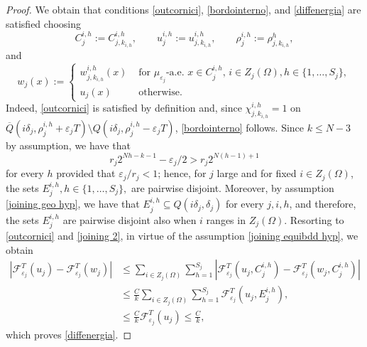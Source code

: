 \documentclass{article}
\theoremstyle{plain}
\theoremstyle{definition}
\newcommand{\ej}{\varepsilon_j}
\newcommand{\rj}{r_j}
\newcommand{\dej}{\delta_j}
\newcommand{\F}{\mathcal{F}}
\newcommand{\Q}
{\overline{Q}}
\numberwithin{equation}{section}
\begin{document}
\begin{proof}
We obtain that conditions \eqref{outcornici}, \eqref{bordointerno}, and \eqref{diffenergia} are satisfied choosing
\begin{equation*}
    C^{i,h}_j:=C^{i,h}_{j,k_{i,h}}, \qquad u_j^{i,h}:=u_{j,k_{i,h}}^{i,h}, \qquad \rho^{i,h}_j:=\rho^{h}_{j, k_{i,h}},
\end{equation*}
     and
     \begin{equation*}
         w_j(x):= \begin{cases}
             w^{i,h}_{j, k_{i,h}}(x) &  \text{ for } \mu_{\ej}\text{-a.e. } x\in C^{i,h}_{j},\,  i\in Z_j(\Omega), h\in\{1,\dots,S_j\}, \\
             u_j(x) & \text{ otherwise}.
         \end{cases}
     \end{equation*}
     Indeed, \eqref{outcornici} is satisfied by definition and, since $\chi_{j, k_{i,h}}^{i,h}=1$ on $\Q(i\dej,\rho^{i,h}_{j}+\ej T)\setminus Q(i\dej,\rho^{i,h}_{j}-\ej T)$, \eqref{bordointerno} follows. Since $k\leq N-3$ by assumption, we have that
     \begin{equation*}
         \rj2^{Nh-k-1}-\ej/2>\rj 2^{N(h-1)+1}
     \end{equation*}
     for every $h$ provided that $\ej/\rj<1$; hence, for $j$ large and for fixed $i\in Z_j(\Omega)$, the sets $E_j^{i,h}, h\in\{1,\dots,S_j\},$ are pairwise disjoint. Moreover, by assumption \eqref{joining geo hyp}, we have that $E^{i,h}_j\subseteq Q(i\dej,\dej)$ for every $j,i,h$, and therefore,
     the sets $E_j^{i,h}$ are pairwise disjoint also when $i$ ranges in $Z_j(\Omega)$. Resorting to \eqref{outcornici} and \eqref{joining 2}, in virtue of the assumption \eqref{joining equibdd hyp}, we obtain
     \begin{align*}
          |\F^T_{\ej}(u_j)-\F^T_{\ej}(w_j)|& \leq \sum_{i\in Z_j(\Omega)}\sum_{h=1}^{S_j}  |\F^T_{\ej}(u_j,C_{j}^{i,h})-\F^T_{\ej}(w_{j},C_{j}^{i,h})| \\
         &  \leq \frac{C}{k}\sum_{i\in Z_j(\Omega)}\sum_{h=1}^{S_j}\F^T_{\ej}(u_j,E_j^{i,h}), \\
         & \leq \frac{C}{k} \F^T_{\ej}(u_j) \leq \frac{C}{k},
     \end{align*}
 which proves \eqref{diffenergia}.


\end{proof}
\end{document}
